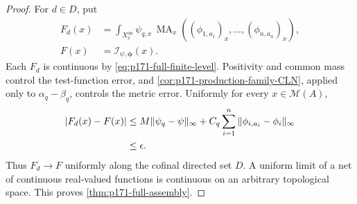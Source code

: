 \begin{proof}
For \(d\in D\), put
\begin{align*}
 F_d(x)&=\int_{X_x^{\mathrm{an}}}\psi_{q,x}\,
   \operatorname{MA}_x
   ((\phi_{1,a_1})_x,\ldots,(\phi_{n,a_n})_x),\\
 F(x)&=\mathcal I_{\psi,\boldsymbol\phi}(x).
\end{align*}
Each \(F_d\) is continuous by \eqref{eq:p171-full-finite-level}.  Positivity
and common mass control the test-function error, and
\cref{cor:p171-production-family-CLN}, applied only to
\(\alpha_q-\beta_q\), controls the metric error.  Uniformly for every
\(x\in\mathcal M(A)\),
\begin{align}
 |F_d(x)-F(x)|
 &\leq M\|\psi_q-\psi\|_\infty
 +C_q\sum_{i=1}^n
   \|\phi_{i,a_i}-\phi_i\|_\infty\notag\\
 &\leq\epsilon.
 \label{eq:p171-full-product-error}
\end{align}
Thus \(F_d\to F\) uniformly along the cofinal directed set \(D\).  A
uniform limit of a net of continuous real-valued functions is continuous
on an arbitrary topological space.  This proves
\cref{thm:p171-full-assembly}.
\end{proof}
